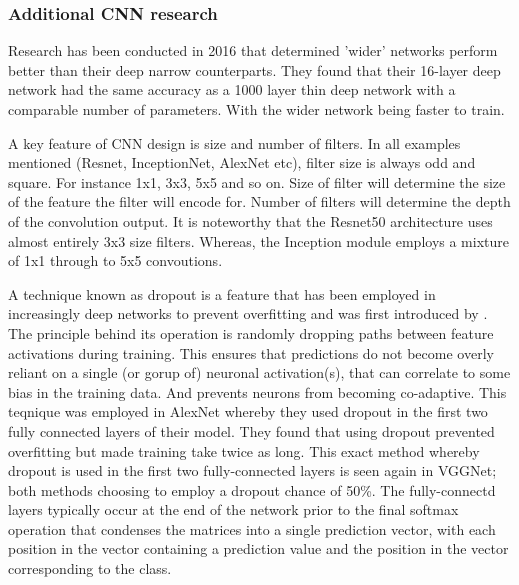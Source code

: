   \subsubsection{Additional CNN research}
    Research has been conducted in 2016 \citep{Zagoruyko} that determined 'wider' networks perform better than their deep narrow counterparts. They found that their 16-layer deep network had the same accuracy as a 1000 layer thin deep network with a comparable number of parameters. With the wider network being faster to train.
    \par
    A key feature of CNN design is size and number of filters. In all examples mentioned (Resnet, InceptionNet, AlexNet etc), filter size is always odd and square. For instance 1x1, 3x3, 5x5 and so on. Size of filter will determine the size of the feature the filter will encode for. Number of filters will determine the depth of the convolution output. It is noteworthy that the Resnet50 architecture \citep{He} uses almost entirely 3x3 size filters. Whereas, the Inception module employs a mixture of 1x1 through to 5x5 convoutions.
    \par
    A technique known as dropout is a feature that has been employed in increasingly deep networks to prevent overfitting and was first introduced by \citep{Srivastava2014}. The principle behind its operation is randomly dropping paths between feature activations during training. This ensures that predictions do not become overly reliant on a single (or gorup of) neuronal activation(s), that can correlate to some bias in the training data. And prevents neurons from becoming co-adaptive. This teqnique was employed in AlexNet \citep{Krizhevsky} whereby they used dropout in the first two fully connected layers of their model. They found that using dropout prevented overfitting but made training take twice as long. This exact method whereby dropout is used in the first two fully-connected layers is seen again in VGGNet\citep{Simonyan2015}; both methods choosing to employ a dropout chance of 50\%. The fully-connectd layers typically occur at the end of the network prior to the final softmax operation that condenses the matrices into a single prediction vector, with each position in the vector containing a prediction value and the position in the vector corresponding to the class.%
    \par
